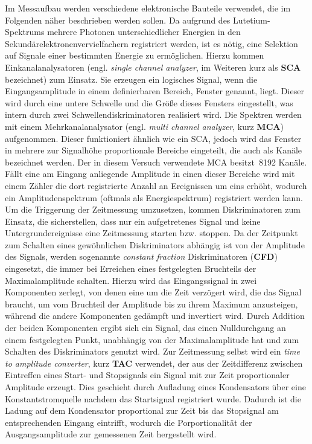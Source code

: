 \documentclass[11pt, a4paper]{article}
\numberwithin{equation}{section}
\begin{document}
Im Messaufbau werden verschiedene elektronische Bauteile verwendet, die im Folgenden näher beschrieben werden sollen.
Da aufgrund des Lutetium-Spektrums mehrere Photonen unterschiedlicher Energien in den Sekundärelektronenvervielfachern registriert werden, ist es nötig, eine Selektion auf Signale einer bestimmten Energie zu ermöglichen.
Hierzu kommen Einkanalanalysatoren (engl. \textit{single channel analyzer}, im Weiteren kurz als \textbf{SCA} bezeichnet) zum Einsatz.
Sie erzeugen ein logisches Signal, wenn die Eingangsamplitude in einem definierbaren Bereich, Fenster genannt, liegt.
Dieser wird durch eine untere Schwelle und die Größe dieses Fensters eingestellt, was intern durch zwei Schwellendiskriminatoren realisiert wird.
Die Spektren werden mit einem Mehrkanalanalysator (engl. \textit{multi channel analyzer}, kurz \textbf{MCA}) aufgenommen.
Dieser funktioniert ähnlich wie ein SCA, jedoch wird das Fenster in mehrere zur Signalhöhe proportionale Bereiche eingeteilt, die auch als Kanäle bezeichnet werden.
Der in diesem Versuch verwendete MCA besitzt~\num{8192} Kanäle.
Fällt eine am Eingang anliegende Amplitude in einen dieser Bereiche wird mit einem Zähler die dort registrierte Anzahl an Ereignissen um eins erhöht, wodurch ein Amplitudenspektrum (oftmals als Energiespektrum) registriert werden kann.
Um die Triggerung der Zeitmessung umzusetzen, kommen Diskriminatoren zum Einsatz, die sicherstellen, dass nur ein aufgetretenes Signal und keine Untergrundereignisse eine Zeitmessung starten bzw. stoppen.
Da der Zeitpunkt zum Schalten eines gewöhnlichen Diskriminators abhängig ist von der Amplitude des Signals, werden sogenannte \textit{constant fraction} Diskriminatoren (\textbf{CFD}) eingesetzt, die immer bei Erreichen eines festgelegten Bruchteils der Maximalamplitude schalten.
Hierzu wird das Eingangssignal in zwei Komponenten zerlegt, von denen eine um die Zeit verzögert wird, die das Signal braucht, um vom Bruchteil der Amplitude bis zu ihrem Maximum anzusteigen, während die andere Komponenten gedämpft und invertiert wird.
Durch Addition der beiden Komponenten ergibt sich ein Signal, das einen Nulldurchgang an einem festgelegten Punkt, unabhängig von der Maximalamplitude hat und zum Schalten des Diskriminators  genutzt wird.
Zur Zeitmessung selbst wird ein \textit{time to amplitude converter}, kurz \textbf{TAC} verwendet, der aus der Zeitdifferenz zwischen Eintreffen eines Start- und Stopsignals ein Signal mit zur Zeit proportionaler Amplitude erzeugt.
Dies geschieht durch Aufladung eines Kondensators über eine Konstantstromquelle nachdem das Startsignal registriert wurde.
Dadurch ist die Ladung auf dem Kondensator proportional zur Zeit bis das Stopsignal am entsprechenden Eingang eintrifft, wodurch die Porportionalität der Ausgangsamplitude zur gemessenen Zeit hergestellt wird. 
\end{document}
